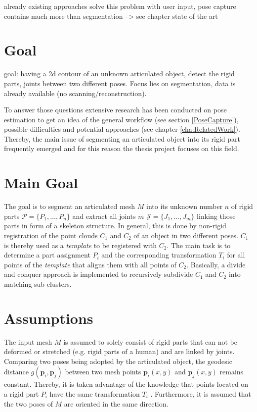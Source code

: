 already existing approaches solve this problem with user input, pose capture contains much more than segmentation --> see chapter state of the art


\section{Goal}

goal: having a 2d contour of an unknown articulated object, detect the rigid parts, joints between two different poses. Focus lies on segmentation, data is already available (no scanning/reconstruction). 

To answer those questions extensive research has been conducted on pose estimation to get an idea of the general workflow (see section \ref{PoseCapture}), possible difficulties and potential approaches (see chapter \ref{cha:RelatedWork}). Thereby, the main issue of segmenting an articulated object into its rigid part frequently emerged and for this reason the thesis project focuses on this field.

\section{Main Goal}

The goal is to segment an articulated mesh $M$ into its unknown number $n$ of rigid parts $\mathcal{P} =  \{P_1,\ldots,P_n\}$ and extract all joints $m$ $\mathcal{J} =  \{J_1,\ldots,J_m\}$ linking those parts in form of a skeleton structure. In general, this is done by non-rigid registration of the point clouds $C_1$ and $C_2$ of an object in two different poses. $C_1$ is thereby used as a \textit{template} to be registered with $C_2$. The main task is to determine a part assignment $P_i$ and the corresponding transformation $T_i$ for all points of the \textit{template} that aligns them with all points of $C_2$. Basically, a divide and conquer approach is implemented to recursively subdivide $C_1$ and $C_2$ into matching sub clusters. 

\section{Assumptions}

The input mesh $M$ is assumed to solely consist of rigid parts that can not be deformed or stretched (e.g. rigid parts of a human) and are linked by joints. Comparing two poses being adopted by the articulated object, the geodesic distance $g(\boldsymbol{p}_i,\boldsymbol{p}_j)$ between two mesh points $\boldsymbol{p}_i(x,y)$ and $\boldsymbol{p}_j(x,y)$ remains constant. Thereby, it is taken advantage of the knowledge that points located on a rigid part $P_i$ have the same transformation $T_i$ . Furthermore, it is assumed that the two poses of $M$ are oriented in the same direction.


